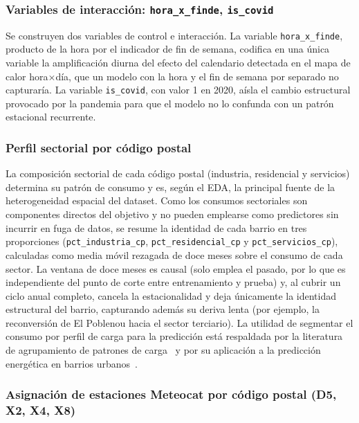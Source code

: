 \documentclass[12pt, a4paper]{article}
\begin{document}
\subsubsection{Variables de interacción: \texttt{hora\_x\_finde}, \texttt{is\_covid}}

Se construyen dos variables de control e interacción. La variable \texttt{hora\_x\_finde}, producto de la hora por el indicador de fin de semana, codifica en una única variable la amplificación diurna del efecto del calendario detectada en el mapa de calor hora$\times$día, que un modelo con la hora y el fin de semana por separado no capturaría. La variable \texttt{is\_covid}, con valor 1 en 2020, aísla el cambio estructural provocado por la pandemia para que el modelo no lo confunda con un patrón estacional recurrente.

\subsubsection{Perfil sectorial por código postal}

La composición sectorial de cada código postal (industria, residencial y servicios) determina su patrón de consumo y es, según el EDA, la principal fuente de la heterogeneidad espacial del dataset. Como los consumos sectoriales son componentes directos del objetivo y no pueden emplearse como predictores sin incurrir en fuga de datos, se resume la identidad de cada barrio en tres proporciones (\texttt{pct\_industria\_cp}, \texttt{pct\_residencial\_cp} y \texttt{pct\_servicios\_cp}), calculadas como media móvil rezagada de doce meses sobre el consumo de cada sector. La ventana de doce meses es causal (solo emplea el pasado, por lo que es independiente del punto de corte entre entrenamiento y prueba) y, al cubrir un ciclo anual completo, cancela la estacionalidad y deja únicamente la identidad estructural del barrio, capturando además su deriva lenta (por ejemplo, la reconversión de El Poblenou hacia el sector terciario). La utilidad de segmentar el consumo por perfil de carga para la predicción está respaldada por la literatura de agrupamiento de patrones de carga~\cite{rajabi2020} y por su aplicación a la predicción energética en barrios urbanos~\cite{jiang2024}.

\subsubsection{Asignación de estaciones Meteocat por código postal (D5, X2, X4, X8)}
\end{document}
